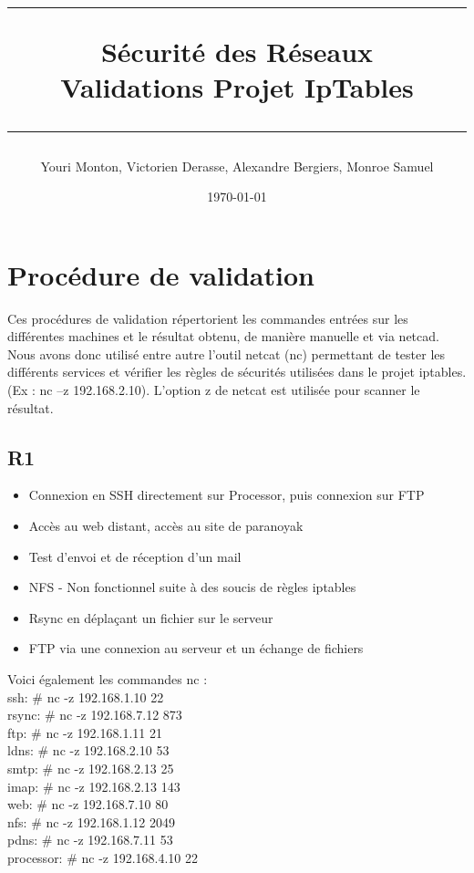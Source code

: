 \documentclass[a4paper,10pt,final,fleqn]{article}
\title{
\parbox{15cm}
{ %
  \vspace{3cm}
	\begin{center}\sf\bfseries\Huge
		\rule{15cm}{1pt}
		\medskip
		Sécurité des Réseaux \\
		\huge Validations Projet IpTables
		\vspace{.5cm}
		\rule{15cm}{1pt}
	\end{center}
	\vspace{3cm}
 }}
\author{Youri Monton, Victorien Derasse, Alexandre Bergiers, Monroe Samuel}
\date{\today}
\begin{document}
\maketitle
\thispagestyle{empty}
\mbox{}

\section{Procédure de validation}

	Ces procédures de validation répertorient les commandes entrées sur les différentes machines et le résultat obtenu, de manière manuelle et via netcad.\\

	Nous avons donc utilisé entre autre l’outil netcat (nc) permettant de tester les différents services  et vérifier les règles de sécurités utilisées dans le projet iptables. (Ex : nc –z 192.168.2.10). L’option z de netcat est utilisée pour scanner le résultat.\\

	\subsection{R1}

	\begin{itemize}
		\item Connexion en SSH directement sur Processor, puis connexion sur FTP
		\item Accès au web distant, accès au site de paranoyak
		\item Test d'envoi et de réception d'un mail
		\item NFS - Non fonctionnel suite à des soucis de règles iptables
		\item Rsync en déplaçant un fichier sur le serveur
		\item FTP via une connexion au serveur et un échange de fichiers\\
	\end{itemize}

	Voici également les commandes nc : \\

	ssh:          # nc -z 192.168.1.10 22\\
	rsync:       # nc -z 192.168.7.12 873\\
	ftp:          # nc -z 192.168.1.11 21\\
	ldns:        # nc -z 192.168.2.10 53\\
	smtp:       # nc -z 192.168.2.13 25\\
	imap:       # nc -z 192.168.2.13 143\\
	web:        # nc -z 192.168.7.10 80\\
	nfs:         # nc -z 192.168.1.12 2049\\
	pdns:       # nc -z 192.168.7.11 53\\
	processor: # nc -z 192.168.4.10 22\\
\end{document}
